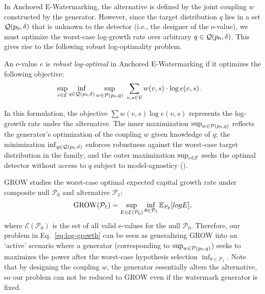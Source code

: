In Anchored E-Watermarking, the alternative is defined by the joint coupling $w$ constructed by the generator. However, since the target distribution $q$ lies in a set $\mathcal{Q}(p_0,\delta)$ that is unknown to the detector (i.e., the designer of the e-value), we must optimize the worst-case log-growth rate over arbitrary $q \in \mathcal{Q}(p_0,\delta)$. This gives rise to the following robust log-optimality problem.

\begin{problem}\label{prob:robust-log-optimal}
An e-value $e$ is \emph{robust log-optimal} in Anchored E-Watermarking if it optimizes the following objective:
\begin{align}\label{eq:log-growth}
    \sup_{e \in \mathcal{E}} \inf_{q \in \mathcal{Q}(p_0,\delta)} \sup_{w \in \mathcal{P}(p_0,q)} &~  \sum_{v,s \in \mathcal{V}} w(v,s) \cdot \log e(v,s).
\end{align}
\end{problem}

In this formulation, the objective $\sum w(v,s) \log e(v,s)$ represents the log-growth rate under the alternative. The inner maximization $\sup_{w \in \mathcal{P}(p_0,q)}$ reflects the generator's optimization of the coupling $w$ given knowledge of $q$; the minimization $\inf_{q \in \mathcal{Q}(p_0,\delta)}$ enforces robustness against the worst-case target distribution in the family; and the outer maximization $\sup_{e \in \mathcal{E}}$ seeks the optimal detector without access to $q$ subject to model-agnosticy ().

\begin{remark}
GROW studies the worst-case optimal expected capital growth rate under composite null $\mathcal{P}_0$ and alternative $\mathcal{P}_1$:
\begin{align*}
    \mathrm{GROW}(\mathcal{P}_1) = \sup_{E\in \mathcal{E}(\mathcal{P}_0)} \inf_{\theta \in \mathcal{P}_1}\mathbb{E}_{P_\theta}[log E],
\end{align*}
where $ \mathcal{E}(\mathcal{P}_0)$ is the set of all valid e-values for the null $\mathcal{P}_0$.
Therefore, our problem in Eq.~\eqref{eq:log-growth} can be seen as generalizing GROW into an `active' scenario where a generator (corresponding to $\sup_{w \in \mathcal{P}(p_0,q)}$) seeks to maximizes the power after the worst-case hypothesis selection $\inf_{\theta \in \mathcal{P}_1}$. Note that by designing the coupling $w$, the generator essentially alters the alternative, so our problem can not be reduced to GROW even if the watermark generator is fixed.
\end{remark}


